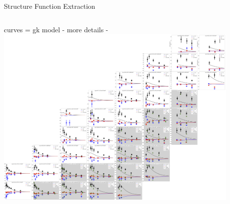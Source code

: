 \documentclass[aspectratio=169]{beamer}
\begin{document}
\begin{frame}{Structure Function Extraction}

\begin{columns}
    curves = gk model
    - more details - 
    \includegraphics[width=0.899\textwidth]{defense/combined_t_final.png}
\end{columns}
\end{frame}
\end{document}
